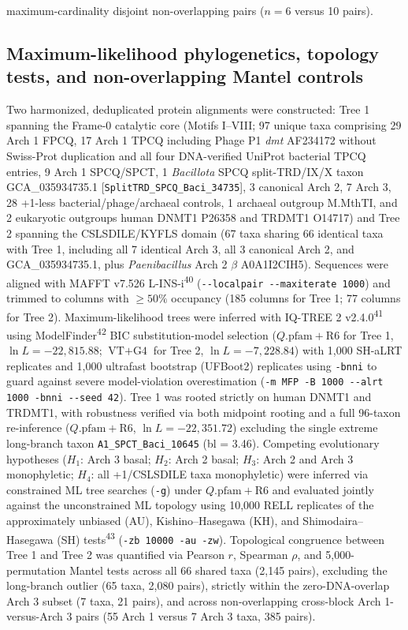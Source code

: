 \documentclass[10pt,letterpaper]{article}
\newcommand{\spname}[1]{\textit{#1}}
\newcommand{\gene}[1]{\textit{#1}}
\newcommand{\refsup}[1]{\textsuperscript{#1}}
\begin{document}
maximum-cardinality disjoint non-overlapping pairs ($n = 6$ versus 10 pairs).

\subsection{Maximum-likelihood phylogenetics, topology tests, and non-overlapping Mantel controls}

Two harmonized, deduplicated protein alignments were constructed: Tree 1 spanning the Frame-0 catalytic core (Motifs I--VIII; 97 unique taxa comprising 29 Arch 1 FPCQ, 17 Arch 1 TPCQ including Phage P1 \gene{dmt} AF234172 without Swiss-Prot duplication and all four DNA-verified UniProt bacterial TPCQ entries, 9 Arch 1 SPCQ/SPCT, 1 \spname{Bacillota} SPCQ split-TRD/IX/X taxon GCA\_035934735.1 [\texttt{SplitTRD\_SPCQ\_Baci\_34735}], 3 canonical Arch 2, 7 Arch 3, 28 +1-less bacterial/phage/archaeal controls, 1 archaeal outgroup M.MthTI, and 2 eukaryotic outgroups human DNMT1 P26358 and TRDMT1 O14717) and Tree 2 spanning the CSLSDILE/KYFLS domain (67 taxa sharing 66 identical taxa with Tree 1, including all 7 identical Arch 3, all 3 canonical Arch 2, and GCA\_035934735.1, plus \spname{Paenibacillus} Arch 2 $\beta$ A0A1I2CIH5). Sequences were aligned with MAFFT v7.526 L-INS-i\refsup{40} (\texttt{-{}-localpair -{}-maxiterate 1000}) and trimmed to columns with $\ge 50\%$ occupancy (185 columns for Tree 1; 77 columns for Tree 2). Maximum-likelihood trees were inferred with IQ-TREE 2 v2.4.0\refsup{41} using ModelFinder\refsup{42} BIC substitution-model selection ($Q.\text{pfam}+\text{R6}$ for Tree 1, $\ln L = -22,815.88$; $\text{VT}+\text{G4}$ for Tree 2, $\ln L = -7,228.84$) with 1,000 SH-aLRT replicates and 1,000 ultrafast bootstrap (UFBoot2) replicates using \texttt{-bnni} to guard against severe model-violation overestimation (\texttt{-m MFP -B 1000 -{}-alrt 1000 -bnni -{}-seed 42}). Tree 1 was rooted strictly on human DNMT1 and TRDMT1, with robustness verified via both midpoint rooting and a full 96-taxon re-inference ($Q.\text{pfam}+\text{R6}$, $\ln L = -22,351.72$) excluding the single extreme long-branch taxon \texttt{A1\_SPCT\_Baci\_10645} (bl = 3.46). Competing evolutionary hypotheses ($H_1$: Arch 3 basal; $H_2$: Arch 2 basal; $H_3$: Arch 2 and Arch 3 monophyletic; $H_4$: all +1/CSLSDILE taxa monophyletic) were inferred via constrained ML tree searches (\texttt{-g}) under $Q.\text{pfam}+\text{R6}$ and evaluated jointly against the unconstrained ML topology using 10,000 RELL replicates of the approximately unbiased (AU), Kishino--Hasegawa (KH), and Shimodaira--Hasegawa (SH) tests\refsup{43} (\texttt{-zb 10000 -au -zw}). Topological congruence between Tree 1 and Tree 2 was quantified via Pearson $r$, Spearman $\rho$, and 5,000-permutation Mantel tests across all 66 shared taxa (2,145 pairs), excluding the long-branch outlier (65 taxa, 2,080 pairs), strictly within the zero-DNA-overlap Arch 3 subset (7 taxa, 21 pairs), and across non-overlapping cross-block Arch 1-versus-Arch 3 pairs (55 Arch 1 versus 7 Arch 3 taxa, 385 pairs).
\end{document}
